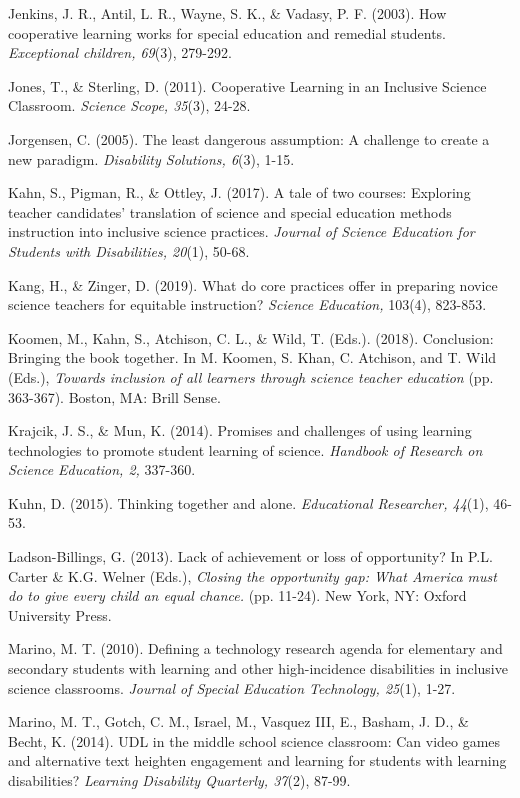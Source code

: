 \documentclass[11.5pt]{sig-alternate}
\begin{document}
Jenkins, J. R., Antil, L. R., Wayne, S. K., \& Vadasy, P. F. (2003). How cooperative learning works for special education and remedial students. \textit{Exceptional children, 69}(3), 279-292.

Jones, T., \& Sterling, D. (2011). Cooperative Learning in an Inclusive Science Classroom. \textit{Science Scope, 35}(3), 24-28. 

Jorgensen, C. (2005). The least dangerous assumption: A challenge to create a new paradigm. \textit{Disability Solutions, 6}(3), 1-15.

Kahn, S., Pigman, R., \& Ottley, J. (2017). A tale of two courses: Exploring teacher candidates' translation of science and special education methods instruction into inclusive science practices. \textit{Journal of Science Education for Students with Disabilities, 20}(1), 50-68.

Kang, H., \& Zinger, D. (2019). What do core practices offer in preparing novice science teachers for equitable instruction? \textit{Science Education,} 103(4), 823-853.

Koomen, M., Kahn, S., Atchison, C. L., \& Wild, T. (Eds.). (2018). Conclusion: Bringing the book together. In M. Koomen, S. Khan, C. Atchison, and T. Wild (Eds.), \textit{Towards inclusion of all learners through science teacher education} (pp. 363-367). Boston, MA: Brill Sense.

Krajcik, J. S., \& Mun, K. (2014). Promises and challenges of using learning technologies to promote student learning of science. \textit{Handbook of Research on Science Education, 2,} 337-360.

Kuhn, D. (2015). Thinking together and alone. \textit{Educational Researcher, 44}(1), 46-53.

Ladson-Billings, G. (2013). Lack of achievement or loss of opportunity? In P.L. Carter \& K.G. Welner (Eds.), \textit{Closing the opportunity gap: What America must do to give every child an equal chance.} (pp. 11-24). New York, NY: Oxford University Press. 

Marino, M. T. (2010). Defining a technology research agenda for elementary and secondary students with learning and other high-incidence disabilities in inclusive science classrooms. \textit{Journal of Special Education Technology, 25}(1), 1-27.

Marino, M. T., Gotch, C. M., Israel, M., Vasquez III, E., Basham, J. D., \& Becht, K. (2014). UDL in the middle school science classroom: Can video games and alternative text heighten engagement and learning for students with learning disabilities? \textit{Learning Disability Quarterly, 37}(2), 87-99.
\end{document}
